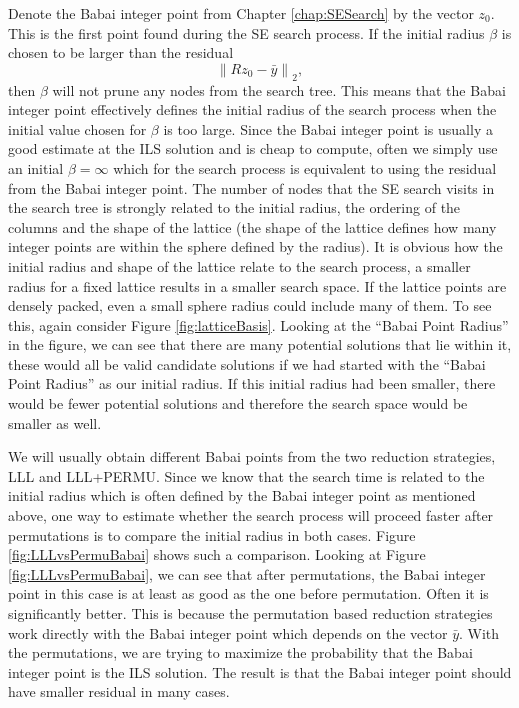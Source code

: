 \documentclass[12pt,Bold,letterpaper]{mcgilletdclass}
\begin{document}
Denote the Babai integer point from Chapter \ref{chap:SESearch} by the vector $z_0$. This is the first point found during the SE search process. If the initial radius $\beta$ is chosen to be larger than the residual $$\left \| Rz_0 - \bar{y} \right \|_2,$$ then $\beta$ will not prune any nodes from the search tree. This means that the Babai integer point effectively defines the initial radius of the search process when the initial value chosen for $\beta$ is too large. Since the Babai integer point is usually a good estimate at the ILS solution and is cheap to compute, often we simply use an initial $\beta = \infty$ which for the search process is equivalent to using the residual from the Babai integer point. The number of nodes that the SE search visits in the search tree is strongly related to the initial radius, the ordering of the columns and the shape of the lattice (the shape of the lattice defines how many integer points are within the sphere defined by the radius). It is obvious how the initial radius and shape of the lattice relate to the search process, a smaller radius for a fixed lattice results in a smaller search space. If the lattice points are densely packed, even a small sphere radius could include many of them. To see this, again consider Figure \ref{fig:latticeBasis}. Looking at the ``Babai Point Radius'' in the figure, we can see that there are many potential solutions that lie within it, these would all be valid candidate solutions if we had started with the ``Babai Point Radius'' as our initial radius. If this initial radius had been smaller, there would be fewer potential solutions and therefore the search space would be smaller as well.

We will usually obtain different Babai points from the two reduction strategies, LLL and LLL+PERMU. Since we know that the search time is related to the initial radius which is often defined by the Babai integer point as mentioned above, one way to estimate whether the search process will proceed faster after permutations is to compare the initial radius in both cases. Figure \ref{fig:LLLvsPermuBabai} shows such a comparison. Looking at Figure \ref{fig:LLLvsPermuBabai}, we can see that after permutations, the Babai integer point in this case is at least as good as the one before permutation. Often it is significantly better.  This is because the permutation based reduction strategies work directly with the Babai integer point which depends on the vector $\bar{y}$. With the permutations, we are trying to maximize the probability that the Babai integer point is the ILS solution. The result is that the Babai integer point should have smaller residual in many cases.
\end{document}
